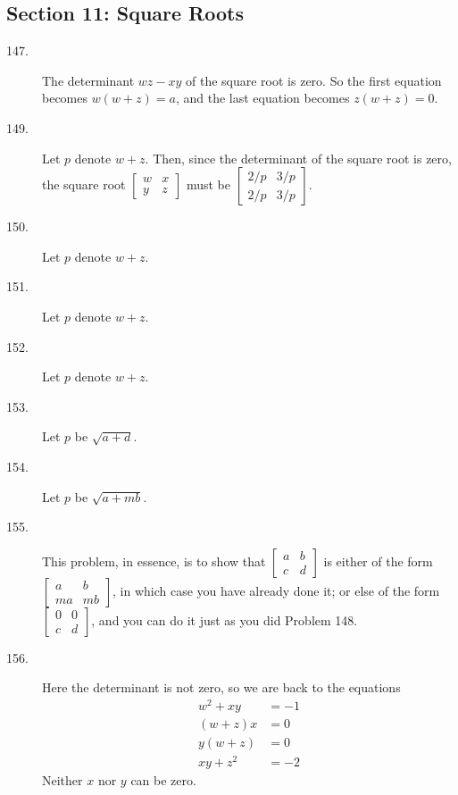 \documentclass{article}
\begin{document}
\subsection*{Section 11: Square Roots}

\begin{description}

  \item[147.] The determinant $wz-xy$ of the square root is zero. So the first equation becomes $w(w+z) = a$, and the last equation becomes $z(w+z) = 0$.

  \item[149.] Let $p$ denote $w+z$. Then, since the determinant of the square root is zero, the square root $\begin{bmatrix} w & x \\ y & z \end{bmatrix}$ must be $\begin{bmatrix} 2/p & 3/p \\ 2/p & 3/p \end{bmatrix}$.

  \item[150.] Let $p$ denote $w+z$.

  \item[151.] Let $p$ denote $w+z$.

  \item[152.] Let $p$ denote $w+z$.

  \item[153.] Let $p$ be $\sqrt{a+d}$.

  \item[154.] Let $p$ be $\sqrt{a+mb}$.

  \item[155.] This problem, in essence, is to show that $\begin{bmatrix} a & b \\ c & d \end{bmatrix}$ is either of the form $\begin{bmatrix} a & b \\ ma & mb \end{bmatrix}$, in which case you have already done it; or else of the form $\begin{bmatrix} 0 & 0 \\ c & d \end{bmatrix}$, and you can do it just as you did Problem 148.

  \item[156.] Here the determinant is not zero, so we are back to the equations
    \begin{align*}
    w^2 + xy & = -1 \\
     (w+z) x & =  0 \\
     y (w+z) & =  0 \\
    xy + z^2 & = -2
    \end{align*}
    Neither $x$ nor $y$ can be zero.


\end{description}
\end{document}
